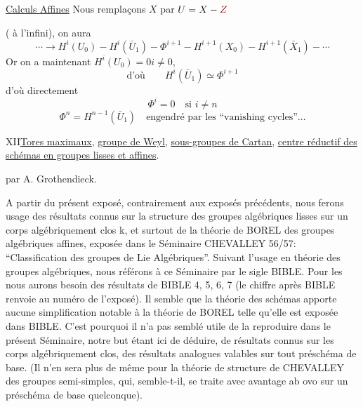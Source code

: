 
\uline{Calculs Affines}\qquad
Nous remplaçons $X$ par $U=X-\unsure{Z}$

( à l'infini), on aura
\[
\cdots\longrightarrow H^i(U_0)\mathbin{-}H^i(\bar U_1)
\mathbin{-}\Phi^{i+1}\mathbin{-}H^{i+1}(X_0)
\mathbin{-}H^{i+1}(\bar X_1)\mathbin{-}\cdots
\]
Or on a maintenant \uline{$H^i(U_0)=0$}\qquad $i\ne0$,
\[
\text{d'où}\qquad H^i(\bar U_1)\simeq\Phi^{i+1}
\]
d'où directement
\[
\Phi^i=0\quad\text{si }i\ne n
\]
\[
\Phi^n=H^{n-1}(\bar U_1)
\quad\text{engendré par les ``vanishing cycles''}\ldots
\]

XII\quad \uline{Tores maximaux}, \uline{groupe de Weyl}, \uline{sous-groupes de Cartan}, \uline{centre
réductif des schémas en groupes lisses et affines}.

par A. Grothendieck.

A partir du présent exposé, contrairement aux exposés précédents,
nous ferons usage des résultats connus sur la structure des groupes
algébriques lisses sur un corps algébriquement clos k, et surtout
de la théorie de BOREL des groupes algébriques affines, exposée dans
le Séminaire CHEVALLEY 56/57:  ``Classification des
groupes de Lie Algébriques''. Suivant l'usage en théorie des groupes
algébriques, nous référons à ce Séminaire par le sigle BIBLE. Pour les
 nous aurons besoin  des résultats de BIBLE 4, 5, 6, 7
(le chiffre après BIBLE renvoie au numéro de l'exposé). Il  semble
 que la théorie des schémas apporte aucune simplification notable
à la théorie  de BOREL  telle qu'elle est exposée
dans BIBLE. C'est pourquoi il n'a pas semblé utile de la reproduire 
 dans le présent Séminaire, notre but étant ici de
déduire, de résultats connus sur les corps algébriquement clos, des
résultats analogues valables sur tout préschéma de base. (Il n'en sera
plus de même pour la théorie de structure de CHEVALLEY des groupes
semi-simples, qui, semble-t-il, se traite avec avantage ab ovo sur un
préschéma de base quelconque).

